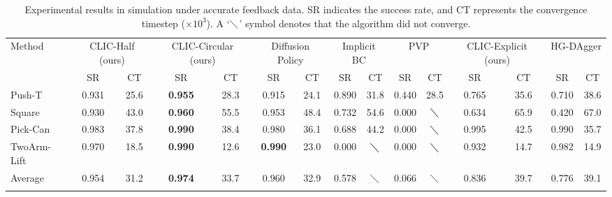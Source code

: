 \begin{table*}[t!]
\footnotesize
\caption{Experimental results in simulation under accurate feedback data. SR indicates the success rate, and CT represents the convergence timestep ($\times 10^3$). A ‘$\diagdown$’ symbol denotes that the algorithm did not converge. 
}
\label{tab:sim_exp_accurate}
\begin{center}
\begin{tabular}{lcccccccccc|cccc}
\Xhline{0.75pt}
Method & \multicolumn{2}{c}{CLIC-Half (ours) } &  \multicolumn{2}{c}{CLIC-Circular (ours)} & \multicolumn{2}{c}{Diffusion Policy} & \multicolumn{2}{c}{Implicit BC} & \multicolumn{2}{c}{PVP} & \multicolumn{2}{c}{CLIC-Explicit (ours)} & \multicolumn{2}{c}{HG-DAgger} \\
 & SR & CT & SR & CT & SR & CT & SR & CT & SR & CT &SR & CT & SR & CT \\ \hline
Push-T & 0.931 & 25.6  & \textbf{0.955} & 28.3 & 0.915 & 24.1 & 0.890 & 31.8 & 0.440 & 28.5 &  0.765 & 35.6 & 0.710 & 38.6  \\
Square & 0.930 & 43.0 & \textbf{0.960} & 55.5 & 0.953 & 48.4 & 0.732 & 54.6 &  0.000 & $\diagdown$   &0.634 & 65.9 & 0.420 & 67.0 \\
Pick-Can & 0.983 & 37.8 & \textbf{0.990} &  38.4 & 0.980 & 36.1 & 0.688 & 44.2 &  0.000 & $\diagdown$    & 0.995 & 42.5 & 0.990 & 35.7 \\
TwoArm-Lift & 0.970 & 18.5 &  \textbf{0.990} & 12.6 & \textbf{0.990} & 23.0 & 0.000 & $\diagdown$ &  0.000 & $\diagdown$    & 0.932 & 14.7 & 0.982 & 14.9  \\
\hline
Average & {0.954} & 31.2 & \textbf{0.974} & 33.7 &  0.960 & 32.9 & 0.578  & $\diagdown$  & 0.066 & $\diagdown$ & 0.836 & 39.7 & 0.776 & 39.1 \\
\Xhline{0.75pt}
\end{tabular}
\end{center}
\end{table*}
